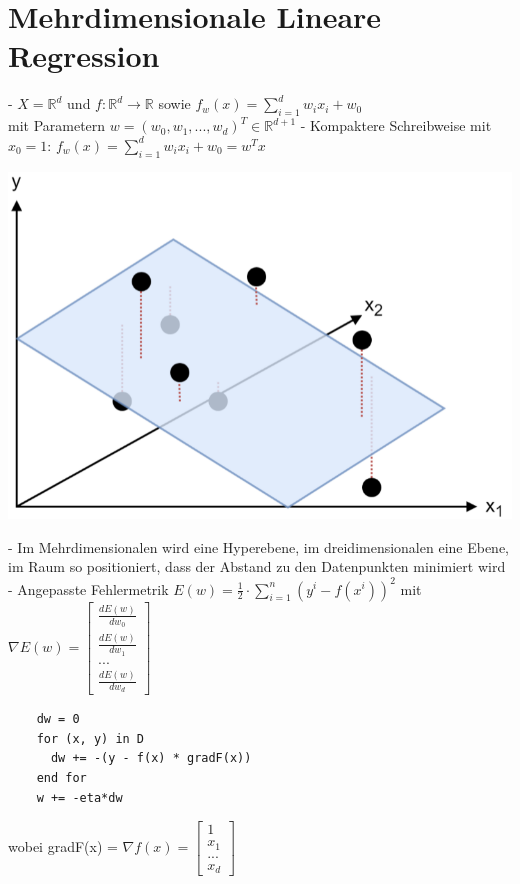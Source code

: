 \documentclass{report}
\begin{document}
  \section{Mehrdimensionale Lineare Regression}	
  - $X = \mathbb{R}^d$ und $f: \mathbb{R}^d \rightarrow \mathbb{R}$ sowie $f_w(x) = \sum_{i=1}^dw_ix_i + w_0$\\	
  mit Parametern $w = (w_0, w_1, ..., w_d)^T \in \mathbb{R}^{d + 1}$	
  - Kompaktere Schreibweise mit $x_0 = 1$: $f_w(x) = \sum_{i = 1}^dw_ix_i + w_0 = w^Tx$\\	
  \begin{center}	
    \includegraphics[scale=.25]{ml02_4}	
  \end{center}	
  - Im Mehrdimensionalen wird eine Hyperebene, im dreidimensionalen eine Ebene, im Raum so positioniert, dass der Abstand zu den Datenpunkten minimiert wird\\	
  - Angepasste Fehlermetrik $E(w) = \frac{1}{2}\cdot \sum_{i=1}^n(y^i - f(x^i))^2$	
  mit $\nabla E(w) = \begin{bmatrix}\frac{dE(w)}{dw_0}\\\frac{dE(w)}{dw_1}\\...\\\frac{dE(w)}{dw_d}\end{bmatrix}$\\	
  \begin{lstlisting}	
    dw = 0	
    for (x, y) in D	
      dw += -(y - f(x) * gradF(x))	
    end for	
    w += -eta*dw	
  \end{lstlisting}	
  wobei gradF(x) = $\nabla f(x) = \begin{bmatrix}1\\x_1\\...\\x_d\end{bmatrix}$\\	
\end{document}
